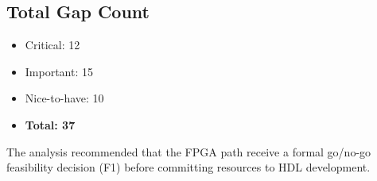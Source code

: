 \subsection{Total Gap Count}

\begin{itemize}
  \item Critical: 12
  \item Important: 15
  \item Nice-to-have: 10
  \item \textbf{Total: 37}
\end{itemize}

The analysis recommended that the FPGA path receive a formal go/no-go
feasibility decision (F1) before committing resources to HDL development.

